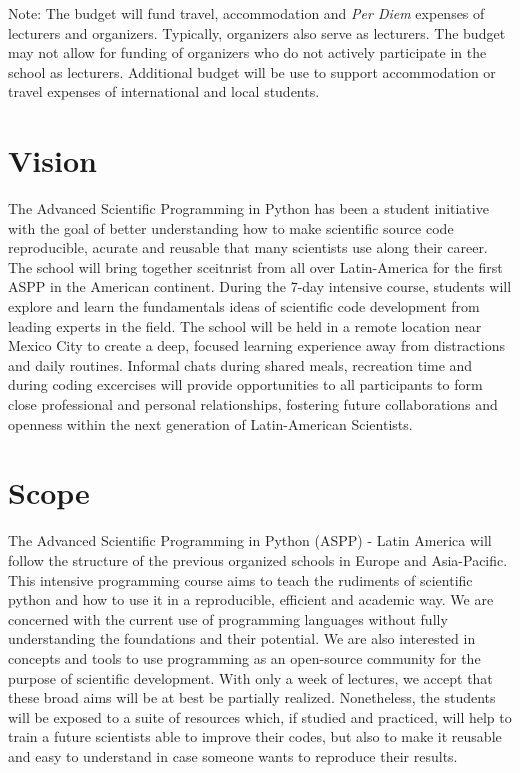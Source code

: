 \documentclass{article}[11pt]
\begin{document}
Note: The budget will fund travel, accommodation and \textit{Per Diem} expenses 
of lecturers and organizers. Typically, organizers also serve as lecturers. The 
budget may not allow for funding of organizers who do not actively participate 
in the school as lecturers. Additional budget will be use to support 
accommodation or travel expenses of international and local students.

\section*{Vision}
The Advanced Scientific Programming in Python has been a student initiative 
with the goal of better understanding how to make scientific source code 
reproducible, acurate and reusable that many scientists use along their career. 
The school will bring together sceitnrist from all over Latin-America for the
first ASPP in the American continent. During the 7-day intensive course, 
students will explore and learn the fundamentals ideas of scientific code 
development from leading experts in the field. The school will be held in a 
remote location near Mexico City to create a deep, focused learning experience 
away from distractions and daily routines. Informal chats during shared meals, 
recreation time and during coding excercises will provide opportunities to all 
participants to form close professional and personal relationships, fostering 
future collaborations and openness within the next generation of Latin-American 
Scientists.

\section*{Scope}

The Advanced Scientific Programming in Python (ASPP) - Latin America will 
follow the structure of the previous organized schools in Europe and 
Asia-Pacific. This intensive programming course aims to teach the rudiments of 
scientific python and how to use it in a reproducible, efficient and academic 
way. We are concerned with the current use of programming languages without 
fully understanding the foundations and their potential. We are also interested 
in concepts and tools to use programming as an open-source community for the 
purpose of scientific development. With only a week of lectures, we accept that 
these broad aims will be at best be partially realized. Nonetheless, the 
students will be exposed to a suite of resources which, if studied and 
practiced, will help to train a future scientists able to improve their 
codes, but also to make it reusable and easy to understand in case someone 
wants to reproduce their results.
\end{document}
